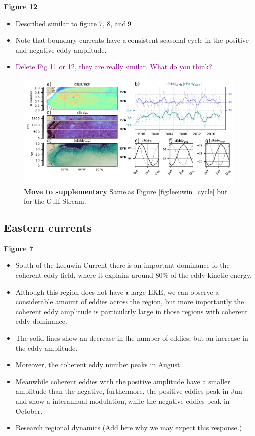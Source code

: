 \documentclass[draft,linenumbers]{agujournal2019}
\newcommand{\EKE}{\textrm{EKE}}
\begin{document}
	\textbf{Figure 12}
	\begin{itemize}
		\item Described similar to figure 7, 8, and 9
		\item Note that boundary currents have a consistent seasonal cycle in the positive and negative eddy amplitude.
		\item \textcolor{purple}{Delete Fig 11 or 12, they are really similar. What do you think?}
	\end{itemize}

	\begin{figure}
	    \centering
	    \includegraphics[width=1\textwidth]{figures/regional_ratios_and_stats_V3_5.pdf}
	    \caption{\textbf{Move to supplementary} Same as Figure \ref{fig:leeuwin_cycle} but for the Gulf Stream.}
	    \label{fig:south_atlantic_cycle}
	\end{figure}

	\subsection{Eastern currents}


	\textbf{Figure 7}
	\begin{itemize}
		\item South of the Leeuwin Current there is an important dominance fo the coherent eddy field, where it explains around 80\% of the eddy kinetic energy.
		\item Although this region does not have a large $\EKE$, we can observe a considerable amount of eddies across the region, but more importantly the coherent eddy amplitude is particularly large in those regions with coherent eddy dominance. 
		\item The solid lines show an decrease in the number of eddies, but an increase in the eddy amplitude. 
		\item Moreover, the coherent eddy number peaks in August.
		\item Meanwhile coherent eddies with the positive amplitude have a smaller amplitude than the negative, furthermore, the positive eddies peak in Jun and show a interannual modulation, while the negative eddies peak in October. 
		\item Research regional dynamics (Add here why we may expect this response.)
	\end{itemize}
\end{document}
